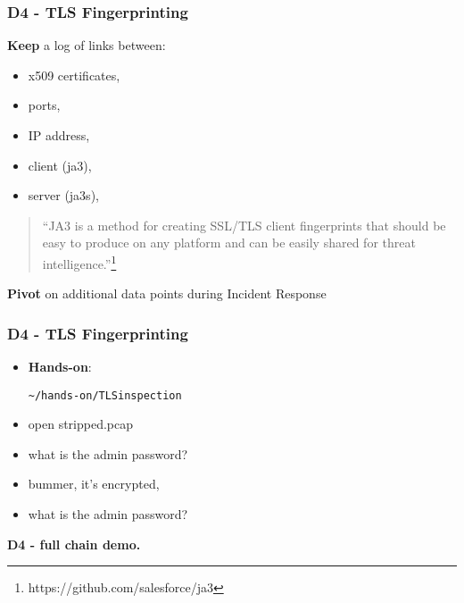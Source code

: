 \begin{frame}
  \frametitle{D4 - TLS Fingerprinting}
        {\bf Keep} a log of links between:
        \begin{itemize}
          \item x509 certificates,
          \item ports,
          \item IP address,
          \item client (ja3),
          \item server (ja3s),
        \end{itemize}
        \begin{quote}
        ``JA3 is a method for creating SSL/TLS client fingerprints that should be easy to produce on any platform and can be easily shared for threat intelligence.''\footnote{https://github.com/salesforce/ja3}
        \end{quote}

         {\bf Pivot} on additional data points during Incident Response 
\end{frame}


\begin{frame}[fragile]
  \frametitle{D4 - TLS Fingerprinting}

\begin{itemize}

   \item {\bf Hands-on}:

\begin{lstlisting}
~/hands-on/TLSinspection
\end{lstlisting}

   \item open stripped.pcap
   \item what is the admin password?
   \item bummer, it's encrypted,
   \item what is the admin password?
   
  \end{itemize}

  \vspace{8mm}
  {\bf D4 - full chain demo.}
 
\end{frame}
